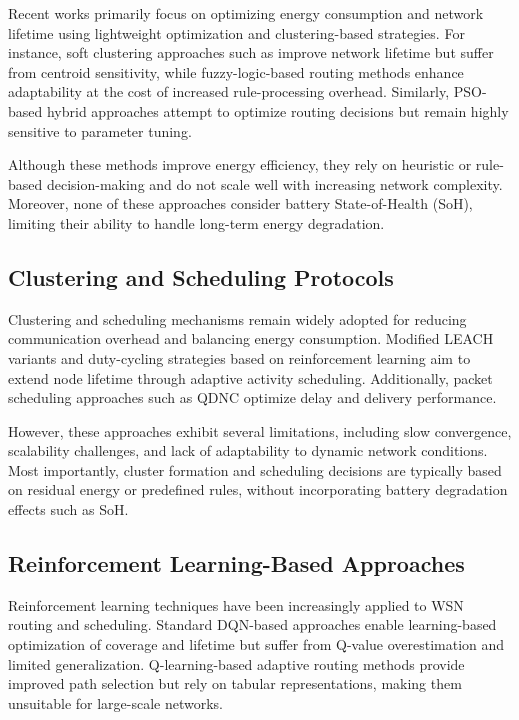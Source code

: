 \documentclass[journal]{IEEEtran}
\begin{document}
Recent works primarily focus on optimizing energy consumption and
network lifetime using lightweight optimization and clustering-based
strategies. For instance, soft clustering approaches such as
\cite{burger2023} improve network lifetime but suffer from centroid
sensitivity, while fuzzy-logic-based routing methods
\cite{nguyen2024} enhance adaptability at the cost of increased
rule-processing overhead. Similarly, PSO-based hybrid approaches
\cite{chang2023} attempt to optimize routing decisions but remain
highly sensitive to parameter tuning.

Although these methods improve energy efficiency, they rely on heuristic
or rule-based decision-making and do not scale well with increasing
network complexity. Moreover, none of these approaches consider battery
State-of-Health (SoH), limiting their ability to handle long-term
energy degradation.

\subsection{Clustering and Scheduling Protocols}

Clustering and scheduling mechanisms remain widely adopted for reducing
communication overhead and balancing energy consumption. Modified LEACH
variants \cite{kaur2021} and duty-cycling strategies based on
reinforcement learning \cite{muhammad2023} aim to extend node lifetime
through adaptive activity scheduling. Additionally, packet scheduling
approaches such as QDNC \cite{li2023} optimize delay and delivery
performance.

However, these approaches exhibit several limitations, including slow
convergence, scalability challenges, and lack of adaptability to dynamic
network conditions. Most importantly, cluster formation and scheduling
decisions are typically based on residual energy or predefined rules,
without incorporating battery degradation effects such as SoH.

\subsection{Reinforcement Learning-Based Approaches}

Reinforcement learning techniques have been increasingly applied to WSN
routing and scheduling. Standard DQN-based approaches \cite{xue2020}
enable learning-based optimization of coverage and lifetime but suffer
from Q-value overestimation and limited generalization. Q-learning-based
adaptive routing methods \cite{su2023} provide improved path selection
but rely on tabular representations, making them unsuitable for
large-scale networks.
\end{document}
